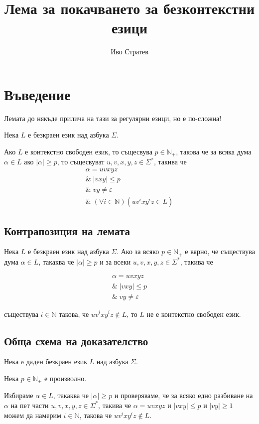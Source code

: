 \documentclass[12pt]{article}
\title{Лема за покачването за безконтекстни езици}
\author{Иво Стратев}
\begin{document}
\maketitle

\section*{Въведение}
Лемата до някъде прилича на тази за регулярни езици, но е по-сложна!


Нека \(L\) е безкраен език над азбука \(\Sigma\).

Ако \(L\) е контекстно свободен език, то същесвува \(p \in \mathbb{N}_+\), такова че
за всяка дума \(\alpha \in L\) ако \(|\alpha| \geq p\), то същесвуват \(u, v, x, y, z \in \Sigma^*\), такива че
\begin{align*}
    \alpha = uvxyz \\
    \&\; |vxy| \leq p \\
    \&\; vy \neq \varepsilon \\
    \&\; (\forall i \in \mathbb N)( uv^ixy^iz \in L )
\end{align*}

\subsection*{Контрапозиция на лемата}
Нека \(L\) е безкраен език над азбука \(\Sigma\).
Ако за всяко \(p \in \mathbb{N}_+\) е вярно, че съществува дума \(\alpha \in L\), такаква че \(|\alpha| \geq p\) и
за всеки \(u, v, x, y, z \in \Sigma^*\), такива че

\begin{align*}
    \alpha = uvxyz \\
    \&\; |vxy| \leq p \\
    \&\; vy \neq \varepsilon
\end{align*}

съществува \(i \in \mathbb{N}\) такова, че \(uv^ixy^iz \notin L\),
то \(L\) не е контекстно свободен език.

\subsection*{Обща схема на доказателство}
Нека e даден безкраен език \(L\) над азбука \(\Sigma\).

Нека \(p \in \mathbb{N}_+\) е произволно.

Избираме \(\alpha \in L\), такаква че \(|\alpha| \geq p\) и
проверяваме, че за всяко едно разбиване на \(\alpha\) на пет части \(u, v, x, y, z \in \Sigma^*\), такива че \(\alpha = uvxyz\) и \(|vxy| \leq p\) и \(|vy| \geq 1\)
можем да намерим \(i \in \mathbb{N}\), такова че \(uv^ixy^iz \notin L\).
\end{document}
